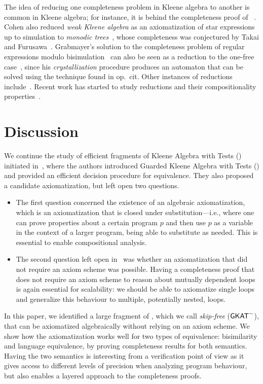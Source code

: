 \documentclass[orivec,envcountsect,envcountsame]{llncs}
\begin{document}
The idea of reducing one completeness problem in Kleene algebra to another is common in Kleene algebra; for instance, it is behind the completeness proof of \KAT~\cite{katcompleteness}.
Cohen also reduced \emph{weak Kleene algebra} as an axiomatization of star expressions up to simulation to \emph{monodic trees}~\cite{ernie}, whose completeness was conjectured by Takai and Furusawa~\cite{monodic}.
Grabmayer's solution to the completeness problem of regular expressions modulo bisimulation~\cite{regexlics} can also be seen as a reduction to the one-free case~\cite{onefreeregexlics}, since his \emph{crystallization} procedure produces an automaton that can be solved using the technique found in op.\ cit.
Other instances of reductions include~\cite{cohen-1994,netkat,hypotheses,pocka,kao,cka,cka-precursor,ka-top,kaequations}.
Recent work has started to study reductions and their compositionality properties~\cite{hypotheses,ckao,kah-tools}.



\section{Discussion}

We continue the study of efficient fragments of Kleene Algebra with Tests (\KAT) initiated in~\cite{gkatpopl}, where the authors introduced Guarded Kleene Algebra with Tests (\GKAT) and provided an efficient decision procedure for equivalence. They also proposed a candidate axiomatization, but left open two questions.
\begin{itemize}
\item
The first question concerned the existence of an algebraic axiomatization, which is an axiomatization that is closed under substitution---i.e., where one can prove properties about a certain program $p$ and then use $p$ as a variable in the context of a larger program, being able to substitute as needed.
This is essential to enable compositional analysis.
\item
The second question left open in~\cite{gkatpopl} was whether an axiomatization that did not require an axiom scheme was possible.
Having a completeness proof that does not require an axiom scheme to reason about mutually dependent loops is again essential for scalability: we should be able to axiomatize single loops and generalize this behaviour to multiple, potentially nested, loops.
\end{itemize}
In this paper, we identified a large fragment of \GKAT, which we call \emph{skip-free \GKAT} ($\textsf{GKAT}^-$), that can be axiomatized algebraically without relying on an axiom scheme.
We show how the axiomatization works well for two types of equivalence: bisimilarity and language equivalence, by proving completeness results for both semantics. Having the two semantics is interesting from a verification point of view as it gives access to different levels of precision when analyzing program behaviour, but also enables a layered approach to the completeness proofs.
\end{document}
